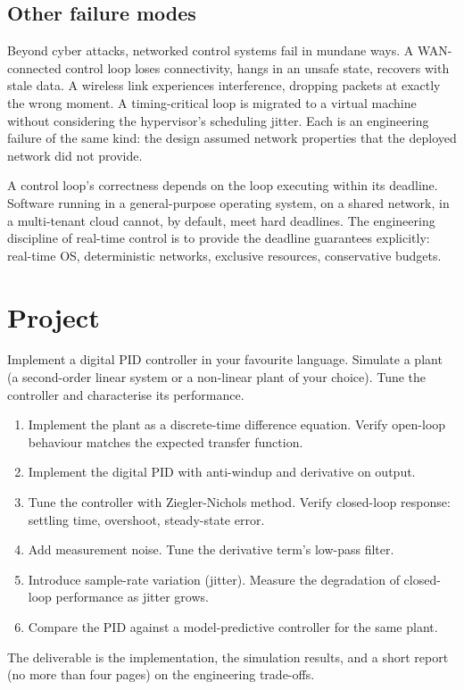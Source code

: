 \subsection{Other failure modes}

Beyond cyber attacks, networked control systems fail in mundane ways. A WAN-connected control loop loses connectivity, hangs in an unsafe state, recovers with stale data. A wireless link experiences interference, dropping packets at exactly the wrong moment. A timing-critical loop is migrated to a virtual machine without considering the hypervisor's scheduling jitter. Each is an engineering failure of the same kind: the design assumed network properties that the deployed network did not provide.

\begin{principle}
A control loop's correctness depends on the loop executing within its deadline. Software running in a general-purpose operating system, on a shared network, in a multi-tenant cloud cannot, by default, meet hard deadlines. The engineering discipline of real-time control is to provide the deadline guarantees explicitly: real-time OS, deterministic networks, exclusive resources, conservative budgets.
\end{principle}

\section{Project}

\begin{project}
Implement a digital PID controller in your favourite language. Simulate a plant (a second-order linear system or a non-linear plant of your choice). Tune the controller and characterise its performance.

\begin{enumerate}[leftmargin=*]
  \item Implement the plant as a discrete-time difference equation. Verify open-loop behaviour matches the expected transfer function.
  \item Implement the digital PID with anti-windup and derivative on output.
  \item Tune the controller with Ziegler-Nichols method. Verify closed-loop response: settling time, overshoot, steady-state error.
  \item Add measurement noise. Tune the derivative term's low-pass filter.
  \item Introduce sample-rate variation (jitter). Measure the degradation of closed-loop performance as jitter grows.
  \item Compare the PID against a model-predictive controller for the same plant.
\end{enumerate}

The deliverable is the implementation, the simulation results, and a short report (no more than four pages) on the engineering trade-offs.
\end{project}

